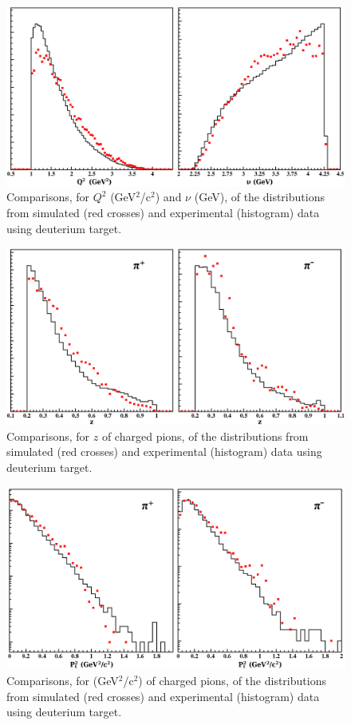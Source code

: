 \begin{figure}[tbp]
\centering
\includegraphics[width=12cm] {chap5-fig/El_compar.png}
\caption {Comparisons, for $Q^2$ (GeV$^2$/c$^2$) and $\nu$ (GeV), of the distributions
from simulated (red crosses) and experimental (histogram) data using deuterium target.}
\label{fig:compNuQ2}
\end{figure}

\begin{figure}[tbp]
\centering
\includegraphics[width=12cm] {chap5-fig/z_compar.png}
\caption {Comparisons, for $z$ of charged pions, of the distributions
from simulated (red crosses) and experimental (histogram) data using deuterium target.}
\label{fig:compZ}
\end{figure}

\begin{figure}[tbp]
\centering
\includegraphics[width=12cm] {chap5-fig/pts_compar.png}
\caption {Comparisons, for \pt (GeV$^2$/c$^2$) of charged pions, of the distributions
from simulated (red crosses) and experimental (histogram) data using deuterium target.}
\label{fig:compPts}
\end{figure}

